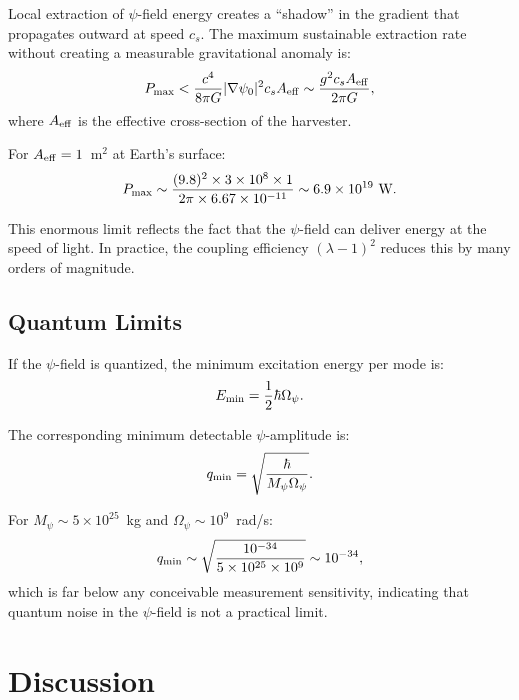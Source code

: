 \documentclass[aps,prd,twocolumn,showpacs,preprintnumbers,superscriptaddress,nofootinbib]{revtex4-2}
\begin{document}
Local extraction of $\psi$-field energy creates a ``shadow'' in the
gradient that propagates outward at speed $c_s$.  The maximum sustainable
extraction rate without creating a measurable gravitational anomaly is:
\begin{equation}
P_{\rm max} < \frac{c^4}{8\pi G}|\nabla\psi_0|^2 c_s A_{\rm eff} \sim \frac{g^2 c_s A_{\rm eff}}{2\pi G},
\end{equation}
where $A_{\rm eff}$ is the effective cross-section of the harvester.

For $A_{\rm eff} = 1$~m$^2$ at Earth's surface:
\begin{equation}
P_{\rm max} \sim \frac{(9.8)^2\times 3\times 10^8\times 1}{2\pi\times 6.67\times 10^{-11}} \sim 6.9\times 10^{19}~\text{W}.
\end{equation}

This enormous limit reflects the fact that the $\psi$-field can deliver
energy at the speed of light.  In practice, the coupling efficiency
$(\lambda-1)^2$ reduces this by many orders of magnitude.

\subsection{Quantum Limits}\label{sec:quantum-limits}

If the $\psi$-field is quantized, the minimum excitation energy per mode
is:
\begin{equation}
E_{\rm min} = \frac{1}{2}\hbar\Omega_\psi.
\end{equation}

The corresponding minimum detectable $\psi$-amplitude is:
\begin{equation}
q_{\rm min} = \sqrt{\frac{\hbar}{M_\psi\Omega_\psi}}.
\end{equation}

For $M_\psi \sim 5\times 10^{25}$~kg and $\Omega_\psi \sim 10^9$~rad/s:
\begin{equation}
q_{\rm min} \sim \sqrt{\frac{10^{-34}}{5\times 10^{25}\times 10^9}} \sim 10^{-34},
\end{equation}
which is far below any conceivable measurement sensitivity, indicating
that quantum noise in the $\psi$-field is not a practical limit.

\section{Discussion}\label{sec:discussion}
\end{document}
